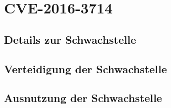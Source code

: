 \chapter{CVE-2016-3714}\label{ch:cve}

%
%
\section{Details zur Schwachstelle}\label{sec:details-zur-schwachstelle}




%
%
\section{Verteidigung der Schwachstelle}\label{sec:verteidigung-der-schwachstelle}



%
%
\section{Ausnutzung der Schwachstelle}\label{sec:ausnutzung-der-schwachstelle}













%
